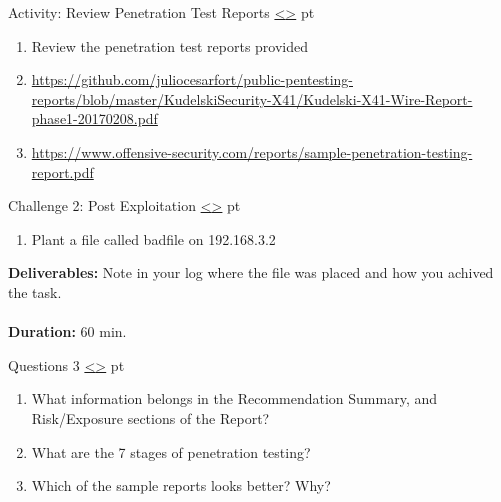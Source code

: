 \documentclass[12pt]{extarticle}
\newenvironment{instructionblock}{\Large\bgroup}{\egroup}
\newcounter{next}
\newcounter{prev}
\begin{document}
\pagebreak
{}
\begin{slide}{Activity: Review Penetration Test Reports}
{\hyperref[slide \theprev]{\textless}\hyperref[slide \thenext]{\textgreater}}
	 pt
	\begin{instructionblock}
		\begin{enumerate}
        	\item Review the penetration test reports provided
            \item  \url{https://github.com/juliocesarfort/public-pentesting-reports/blob/master/KudelskiSecurity-X41/Kudelski-X41-Wire-Report-phase1-20170208.pdf}  \cite{Ref:Sample1}
            \item \url{https://www.offensive-security.com/reports/sample-penetration-testing-report.pdf}\cite{Ref:Sample2}
		\end{enumerate}
	\end{instructionblock}
\end{slide}

\pagebreak
{}
\begin{slide}{Challenge 2: Post Exploitation}
{\hyperref[slide \theprev]{\textless}\hyperref[slide \thenext]{\textgreater}}
	 pt
	\begin{instructionblock}
		\begin{enumerate}
            \item Plant a file called badfile on 192.168.3.2
		\end{enumerate}
        \textbf{Deliverables:} Note in your log where the file was placed and how you achived the task.\\\\
        \textbf{Duration:} 60 min.
	\end{instructionblock}
\end{slide}

\pagebreak
{}
\begin{slide}{Questions 3}
{\hyperref[slide \theprev]{\textless}\hyperref[slide \thenext]{\textgreater}}
	 pt
	\begin{instructionblock}
		\begin{enumerate}
            \item What information belongs in the Recommendation Summary, and Risk/Exposure sections of the Report?
            \item What are the 7 stages of penetration testing?
            \item Which of the sample reports looks better? Why?
		\end{enumerate}
	\end{instructionblock}
\end{slide}
\end{document}
